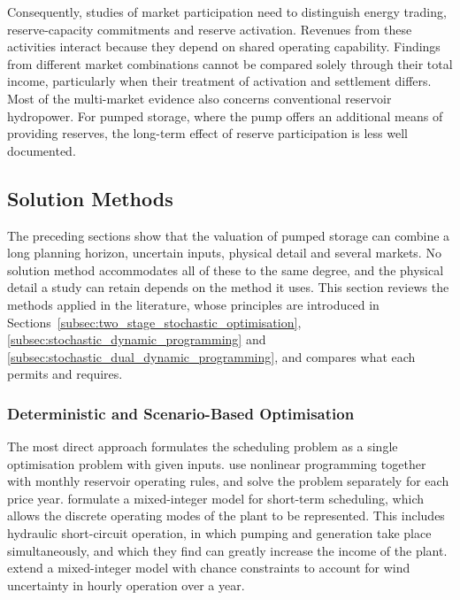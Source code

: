 Consequently, studies of market participation need to distinguish energy
trading, reserve-capacity commitments and reserve activation. Revenues
from these activities interact because they depend on shared operating
capability. Findings from different market combinations cannot be
compared solely through their total income, particularly when their
treatment of activation and settlement differs. Most of the multi-market
evidence also concerns conventional reservoir hydropower. For pumped
storage, where the pump offers an additional means of providing
reserves, the long-term effect of reserve participation is less well
documented.

\subsection{Solution Methods}
\label{sec:lit_methods}

The preceding sections show that the valuation of pumped storage can
combine a long planning horizon, uncertain inputs, physical detail and
several markets. No solution method accommodates all of these to the
same degree, and the physical detail a study can retain depends on the
method it uses. This section reviews the methods applied in the
literature, whose principles are introduced in
Sections~\ref{subsec:two_stage_stochastic_optimisation},
\ref{subsec:stochastic_dynamic_programming} and
\ref{subsec:stochastic_dual_dynamic_programming}, and compares what each
permits and requires.

\subsubsection{Deterministic and Scenario-Based Optimisation}

The most direct approach formulates the scheduling problem as a single
optimisation problem with given inputs. \citet{ak2019quantifying} use
nonlinear programming together with monthly reservoir operating rules,
and solve the problem separately for each price year.
\citet{chazarra2017} formulate a mixed-integer model for short-term
scheduling, which allows the discrete operating modes of the plant to be
represented. This includes hydraulic short-circuit operation, in which
pumping and generation take place simultaneously, and which they find
can greatly increase the income of the plant.
\citet{naval2025optimization} extend a mixed-integer model with chance
constraints to account for wind uncertainty in hourly operation over a
year.

